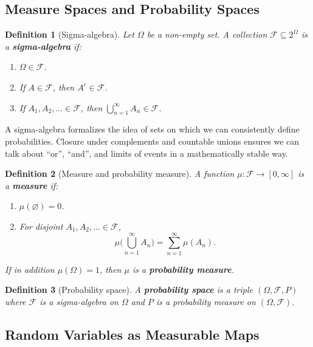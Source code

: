 \documentclass[11pt,a4paper]{article}
\newtheorem{definition}{Definition}[section]
\numberwithin{equation}{section}
\begin{document}
\subsection{Measure Spaces and Probability Spaces}

\begin{definition}[Sigma-algebra]
Let $\Omega$ be a non-empty set. 
A collection $\mathcal{F} \subseteq 2^\Omega$ is a \textbf{sigma-algebra} if:
\begin{enumerate}[label=(\roman*)]
    \item $\Omega \in \mathcal{F}$.
    \item If $A \in \mathcal{F}$, then $A^c \in \mathcal{F}$.
    \item If $A_1,A_2,\dots \in \mathcal{F}$, then $\displaystyle \bigcup_{n=1}^\infty A_n \in \mathcal{F}$.
\end{enumerate}
\end{definition}

A sigma-algebra formalizes the idea of sets on which we can consistently define probabilities. 
Closure under complements and countable unions ensures we can talk about ``or'', ``and'', and limits of events in a mathematically stable way.

\begin{definition}[Measure and probability measure]
A function $\mu : \mathcal{F} \to [0,\infty]$ is a \textbf{measure} if:
\begin{enumerate}[label=(\roman*)]
    \item $\mu(\varnothing) = 0$.
    \item For disjoint $A_1,A_2,\dots \in \mathcal{F}$,
    \[
      \mu\Big(\bigcup_{n=1}^\infty A_n\Big)
      = \sum_{n=1}^\infty \mu(A_n).
    \]
\end{enumerate}
If in addition $\mu(\Omega)=1$, then $\mu$ is a \textbf{probability measure}.
\end{definition}

\begin{definition}[Probability space]
A \textbf{probability space} is a triple $(\Omega,\mathcal{F},P)$ where $\mathcal{F}$ is a sigma-algebra on $\Omega$ and $P$ is a probability measure on $(\Omega,\mathcal{F})$.
\end{definition}

\subsection{Random Variables as Measurable Maps}
\end{document}
